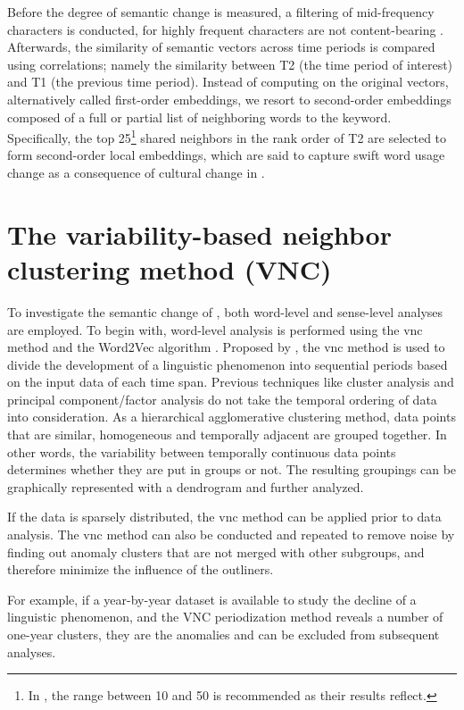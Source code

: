 Before the degree of semantic change is measured, a filtering of mid-frequency
characters is conducted, for highly frequent characters are not content-bearing \parencite{hamilton2016cultural,rodda2017panta}. Afterwards, the similarity of semantic vectors across time
periods is compared using correlations; namely the similarity between T2 (the time period of
interest) and T1 (the previous time period). Instead of computing on the original vectors,
alternatively called first-order embeddings, we resort to second-order embeddings composed
of a full or partial list of neighboring words to the keyword. Specifically, the top 25\footnote{In \textcite{hamilton2016cultural}, the range between 10 and 50 is recommended as their results reflect.} shared
neighbors in the rank order of T2 are selected to form second-order local embeddings, which
are said to capture swift word usage change as a consequence of cultural change in \textcite{hamilton2016cultural}.

\section{The variability-based neighbor clustering method ({VNC})}
To investigate the semantic change of \jia\rspace, both word-level and sense-level analyses are employed. To begin with, word-level analysis is performed using the \gls{vnc} method \parencite{gries2012variability} and the Word2Vec algorithm \parencite{mikolov2013efficient}. Proposed by \textcite{gries2012variability}, the \gls{vnc} method is used to divide the development of a linguistic phenomenon into sequential periods based on the input data of each time span. Previous techniques like cluster analysis and principal component/factor analysis do not take the temporal ordering of data into consideration. As a hierarchical agglomerative clustering method, data points that are similar, homogeneous and temporally adjacent are grouped together. In other words, the variability between temporally continuous data points determines whether they are put in groups or not. The resulting groupings can be graphically represented with a dendrogram and further analyzed.

If the data is sparsely distributed, the \gls{vnc} method can be applied prior to data analysis. The \gls{vnc} method can also be conducted and repeated to remove noise by finding out anomaly clusters that are not merged with other subgroups, and therefore minimize the influence of the outliners.

For example, if a year-by-year dataset is available to study the decline of a linguistic phenomenon, and the VNC periodization method reveals a number of one-year clusters, they are the anomalies and can be excluded from subsequent analyses.

